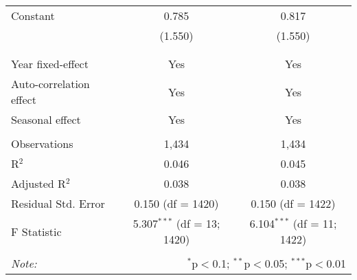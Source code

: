 \begin{table}[!htbp]
\begin{tabular}{@{\extracolsep{5pt}}lcc}
 Constant & 0.785 & 0.817 \\ 
  & (1.550) & (1.550) \\ 
  & & \\ 
\hline \\[-1.8ex] 
Year fixed-effect & Yes & Yes \\ 
Auto-correlation effect & Yes & Yes \\ 
Seasonal effect & Yes & Yes \\ 
\hline \\[-1.8ex] 
Observations & 1,434 & 1,434 \\ 
R$^{2}$ & 0.046 & 0.045 \\ 
Adjusted R$^{2}$ & 0.038 & 0.038 \\ 
Residual Std. Error & 0.150 (df = 1420) & 0.150 (df = 1422) \\ 
F Statistic & 5.307$^{***}$ (df = 13; 1420) & 6.104$^{***}$ (df = 11; 1422) \\ 
\hline 
\hline \\[-1.8ex] 
\textit{Note:}  & \multicolumn{2}{r}{$^{*}$p$<$0.1; $^{**}$p$<$0.05; $^{***}$p$<$0.01} \\ 
\end{tabular} 
\end{table} 
